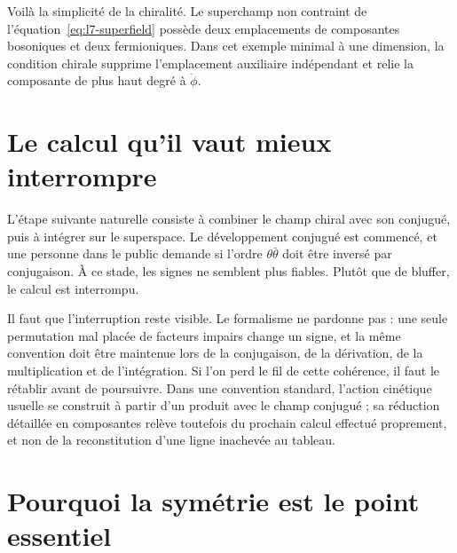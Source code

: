 Voilà la simplicité de la chiralité. Le superchamp non contraint de l’équation~\eqref{eq:l7-superfield} possède deux emplacements de composantes bosoniques et deux fermioniques. Dans cet exemple minimal à une dimension, la condition chirale supprime l’emplacement auxiliaire indépendant et relie la composante de plus haut degré à \(\dot\phi\).

\section{Le calcul qu’il vaut mieux interrompre}

L’étape suivante naturelle consiste à combiner le champ chiral avec son conjugué, puis à intégrer sur le superspace. Le développement conjugué est commencé, et une personne dans le public demande si l’ordre \(\theta\bar\theta\) doit être inversé par conjugaison. À ce stade, les signes ne semblent plus fiables. Plutôt que de bluffer, le calcul est interrompu.

\begin{classroomqa}
\end{classroomqa}

Il faut que l’interruption reste visible. Le formalisme ne pardonne pas : une seule permutation mal placée de facteurs impairs change un signe, et la même convention doit être maintenue lors de la conjugaison, de la dérivation, de la multiplication et de l’intégration. Si l’on perd le fil de cette cohérence, il faut le rétablir avant de poursuivre. Dans une convention standard, l’action cinétique usuelle se construit à partir d’un produit avec le champ conjugué ; sa réduction détaillée en composantes relève toutefois du prochain calcul effectué proprement, et non de la reconstitution d’une ligne inachevée au tableau.

\section{Pourquoi la symétrie est le point essentiel}

